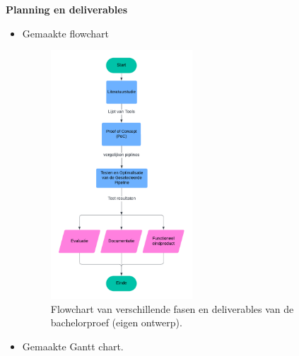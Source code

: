 \vspace{1em}
\textbf{Planning en deliverables}

\begin{itemize}
    \item Gemaakte flowchart
    
    \begin{figure}[H]  %
        \centering
        \includegraphics[width=0.5\textwidth]{foto's/Flowchart.png}  %
        \caption{Flowchart van verschillende fasen en deliverables van de bachelorproef (eigen ontwerp).}
        \label{fig:flowchart}  %
    \end{figure}
    
    \item Gemaakte Gantt chart.
    
    \begin{figure}[H]  %
        \centering
\end{figure}
\end{itemize}
